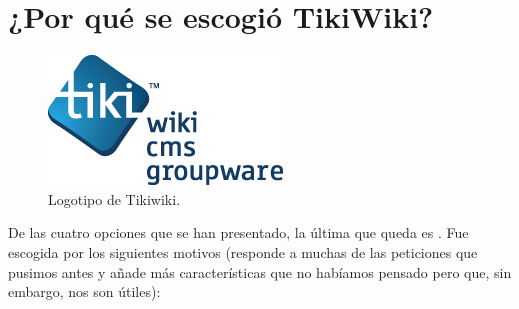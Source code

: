 \section{¿Por qué se escogió TikiWiki?}

\begin{figure}
\centering
\includegraphics[scale=0.75]{../graphics/tiki-logo.png}
\caption{Logotipo de Tikiwiki.}\label{fig:tikiwiki_logo}
\end{figure}

De las cuatro opciones que se han presentado, la última que queda es \tiki{}. Fue escogida por los siguientes motivos (responde a muchas de las peticiones que pusimos antes y añade más características que no habíamos pensado pero que, sin embargo, nos son útiles):

